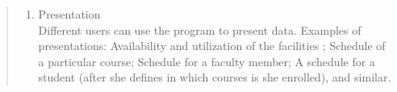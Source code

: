 \documentclass{article}
\begin{document}
\begin{quotation}
\begin{enumerate}
\item Presentation \\
Different users can use the program to present data. Examples of presentations: Availability and utilization of the facilities ; Schedule of a particular course; Schedule for a faculty member; A schedule for a student (after she defines in which courses is she enrolled), and similar.
\end{enumerate}

\end{quotation}



 
\end{document}
